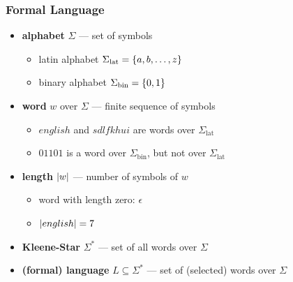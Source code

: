 \documentclass{beamer}
\DeclareMathOperator{\lat}{lat}
\DeclareMathOperator{\bin}{bin}
\renewcommand{\emph}[1]{\textbf{#1}}
\begin{document}
	\begin{frame} \frametitle{Formal Language}
		\begin{itemize}
			\item<+-> \emph{alphabet} $\Sigma$ --- set of symbols
			\begin{itemize}
				\item latin alphabet $\Sigma_{\lat} = \menge{a, b, \dots, z}$
				\item binary alphabet $\Sigma_{\bin} = \menge{0,1}$
			\end{itemize}
			\item<+-> \emph{word} $w$ over $\Sigma$ --- finite sequence of symbols 
			\begin{itemize}
				\item $english$ and $sdlfkhui$ are words over $\Sigma_{\lat}$
				\item $01101$ is a word over $\Sigma_{\bin}$, but not over $\Sigma_{\lat}$ 
			\end{itemize}
			\item<+-> \emph{length} $\left| w \right|$ --- number of symbols of $w$
			\begin{itemize}
				\item word with length zero: $\epsilon$
				\item $\left| english \right| = 7$
			\end{itemize}
			\item<+-> \emph{Kleene-Star} $\Sigma^\ast$ --- set of all words over $\Sigma$
			\item<+-> \emph{(formal) language} $L \subseteq \Sigma^\ast$ --- set of (selected) words over $\Sigma$
		\end{itemize}
	\end{frame}
\end{document}
